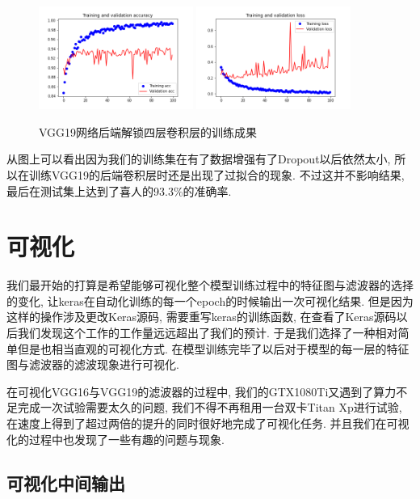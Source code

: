 \documentclass[lang=cn,11pt]{elegantpaper}
\begin{document}
\begin{figure}[hbt]
\centering
  \includegraphics[width=0.45\textwidth]{VGG_19_unlocked_1}
  \includegraphics[width=0.45\textwidth]{VGG_19_unlocked_2}
  \caption{VGG19网络后端解锁四层卷积层的训练成果}
\end{figure}

从图上可以看出因为我们的训练集在有了数据增强有了Dropout以后依然太小, 所以在训练VGG19的后端卷积层时还是出现了过拟合的现象. 不过这并不影响结果, 最后在测试集上达到了喜人的93.3\%的准确率.





\section{可视化}

我们最开始的打算是希望能够可视化整个模型训练过程中的特征图与滤波器的选择的变化, 让keras在自动化训练的每一个epoch的时候输出一次可视化结果. 但是因为这样的操作涉及更改Keras源码, 需要重写keras的训练函数, 在查看了Keras源码以后我们发现这个工作的工作量远远超出了我们的预计. 于是我们选择了一种相对简单但是也相当直观的可视化方式. 在模型训练完毕了以后对于模型的每一层的特征图与滤波器的滤波现象进行可视化.

在可视化VGG16与VGG19的滤波器的过程中, 我们的GTX1080Ti又遇到了算力不足完成一次试验需要太久的问题, 我们不得不再租用一台双卡Titan Xp进行试验, 在速度上得到了超过两倍的提升的同时很好地完成了可视化任务. 并且我们在可视化的过程中也发现了一些有趣的问题与现象.



\subsection{可视化中间输出}
\end{document}
